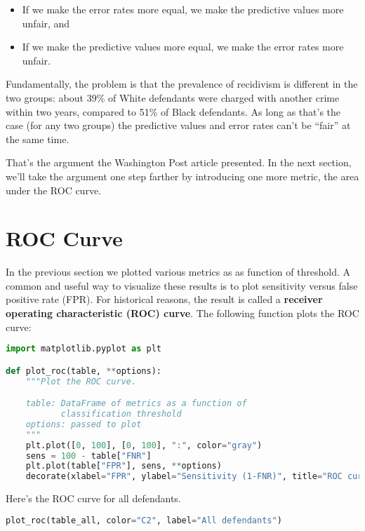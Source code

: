 \begin{itemize}
\item
  If we make the error rates more equal, we make the predictive values
  more unfair, and
\item
  If we make the predictive values more equal, we make the error rates
  more unfair.
\end{itemize}

Fundamentally, the problem is that the prevalence of recidivism is
different in the two groups: about 39\% of White defendants were charged
with another crime within two years, compared to 51\% of Black
defendants. As long as that's the case (for any two groups) the
predictive values and error rates can't be ``fair'' at the same time.

That's the argument the Washington Post article presented. In the next
section, we'll take the argument one step farther by introducing one
more metric, the area under the ROC curve.

\section{ROC Curve}\label{roc-curve}

In the previous section we plotted various metrics as as function of
threshold. A common and useful way to visualize these results is to plot
sensitivity versus false positive rate (FPR). For historical reasons,
the result is called a \textbf{receiver operating characteristic (ROC)
curve}. The following function plots the ROC curve:

\begin{lstlisting}[language=Python,style=source]
import matplotlib.pyplot as plt

def plot_roc(table, **options):
    """Plot the ROC curve.

    table: DataFrame of metrics as a function of
           classification threshold
    options: passed to plot
    """
    plt.plot([0, 100], [0, 100], ":", color="gray")
    sens = 100 - table["FNR"]
    plt.plot(table["FPR"], sens, **options)
    decorate(xlabel="FPR", ylabel="Sensitivity (1-FNR)", title="ROC curve")
\end{lstlisting}

Here's the ROC curve for all defendants.

\begin{lstlisting}[language=Python,style=source]
plot_roc(table_all, color="C2", label="All defendants")
\end{lstlisting}

